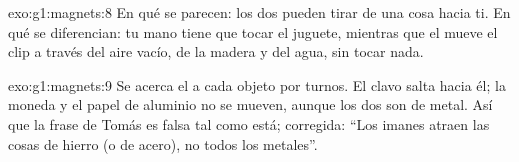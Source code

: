\begin{solution}{exo:g1:magnets:8}
En qué se parecen: los dos pueden tirar de una cosa hacia ti. En qué
se diferencian: tu mano tiene que tocar el juguete, mientras que el
 mueve el clip a través del aire vacío, de la madera y del
agua, sin tocar nada.
\end{solution}

\begin{solution}{exo:g1:magnets:9}
Se acerca el  a cada objeto por turnos. El clavo salta hacia él;
la moneda y el papel de aluminio no se mueven, aunque los dos son de
metal. Así que la frase de Tomás es falsa tal como está; corregida:
``Los imanes atraen las cosas de hierro (o de acero), no todos
los metales''.
\end{solution}

